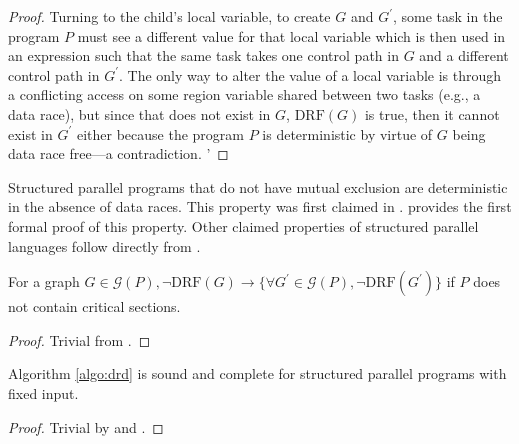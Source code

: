 \begin{proof}
  Turning to the child's local variable, to create $G$ and $G^\prime$, some task in the program $P$ must see a different value for that local variable which is then used in an expression such that the same task takes one control path in $G$ and a different control path in $G^\prime$. The only way to alter the value of a local variable is through a conflicting access on some region variable shared between two tasks (e.g., a data race), but since that does not exist in $G$, $\mathrm{DRF}( G )$ is true, then it cannot exist in $G^\prime$ either because the program $P$ is deterministic by virtue of $G$ being data race free---a contradiction. '
\end{proof}

Structured parallel programs that do not have mutual exclusion are deterministic in the absence of data races. This property was first claimed in \cite{cave2011habanero}.  provides the first formal proof of this property. Other claimed properties of structured parallel languages follow directly from .

\begin{corollary}\label{cor:drf}
For a graph $G \in \mathcal{G}( P ), \neg\mathrm{DRF}( G ) \rightarrow \{\forall G^\prime \in \mathcal{G}( P ), \neg\mathrm{DRF}( G^\prime ) \}$ if $P$ does not contain critical sections.
\end{corollary}
\begin{proof}
Trivial from .
\end{proof}

\begin{theorem} \label{thm:strcutured-par-progs}
Algorithm \ref{algo:drd} is sound and complete for structured parallel programs with fixed input.
\end{theorem}
\begin{proof}
Trivial by  and .
\end{proof}
